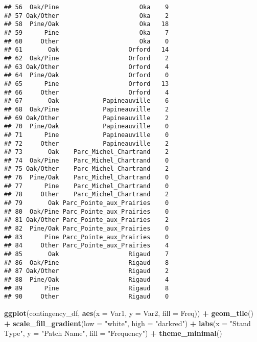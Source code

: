 \documentclass[
]{article}
\newenvironment{Shaded}{\begin{snugshade}}{\end{snugshade}}
\newcommand{\AttributeTok}[1]{\textcolor[rgb]{0.13,0.29,0.53}{#1}}
\newcommand{\FunctionTok}[1]{\textcolor[rgb]{0.13,0.29,0.53}{\textbf{#1}}}
\newcommand{\NormalTok}[1]{#1}
\newcommand{\SpecialCharTok}[1]{\textcolor[rgb]{0.81,0.36,0.00}{\textbf{#1}}}
\newcommand{\StringTok}[1]{\textcolor[rgb]{0.31,0.60,0.02}{#1}}
\begin{document}
\begin{verbatim}
## 56  Oak/Pine                      Oka    9
## 57 Oak/Other                      Oka    2
## 58  Pine/Oak                      Oka   18
## 59      Pine                      Oka    7
## 60     Other                      Oka    0
## 61       Oak                   Orford   14
## 62  Oak/Pine                   Orford    2
## 63 Oak/Other                   Orford    4
## 64  Pine/Oak                   Orford    0
## 65      Pine                   Orford   13
## 66     Other                   Orford    4
## 67       Oak            Papineauville    6
## 68  Oak/Pine            Papineauville    2
## 69 Oak/Other            Papineauville    2
## 70  Pine/Oak            Papineauville    0
## 71      Pine            Papineauville    0
## 72     Other            Papineauville    2
## 73       Oak    Parc_Michel_Chartrand    2
## 74  Oak/Pine    Parc_Michel_Chartrand    0
## 75 Oak/Other    Parc_Michel_Chartrand    2
## 76  Pine/Oak    Parc_Michel_Chartrand    0
## 77      Pine    Parc_Michel_Chartrand    0
## 78     Other    Parc_Michel_Chartrand    2
## 79       Oak Parc_Pointe_aux_Prairies    0
## 80  Oak/Pine Parc_Pointe_aux_Prairies    0
## 81 Oak/Other Parc_Pointe_aux_Prairies    2
## 82  Pine/Oak Parc_Pointe_aux_Prairies    0
## 83      Pine Parc_Pointe_aux_Prairies    0
## 84     Other Parc_Pointe_aux_Prairies    4
## 85       Oak                   Rigaud    7
## 86  Oak/Pine                   Rigaud    8
## 87 Oak/Other                   Rigaud    2
## 88  Pine/Oak                   Rigaud    4
## 89      Pine                   Rigaud    8
## 90     Other                   Rigaud    0
\end{verbatim}

\begin{Shaded}
\begin{Highlighting}[]
\FunctionTok{ggplot}\NormalTok{(contingency\_df, }\FunctionTok{aes}\NormalTok{(}\AttributeTok{x =}\NormalTok{ Var1, }\AttributeTok{y =}\NormalTok{ Var2, }\AttributeTok{fill =}\NormalTok{ Freq)) }\SpecialCharTok{+}
  \FunctionTok{geom\_tile}\NormalTok{() }\SpecialCharTok{+}
  \FunctionTok{scale\_fill\_gradient}\NormalTok{(}\AttributeTok{low =} \StringTok{"white"}\NormalTok{, }\AttributeTok{high =} \StringTok{"darkred"}\NormalTok{) }\SpecialCharTok{+}
  \FunctionTok{labs}\NormalTok{(}\AttributeTok{x =} \StringTok{"Stand Type"}\NormalTok{, }\AttributeTok{y =} \StringTok{"Patch Name"}\NormalTok{, }\AttributeTok{fill =} \StringTok{"Frequency"}\NormalTok{) }\SpecialCharTok{+}
  \FunctionTok{theme\_minimal}\NormalTok{()}
\end{Highlighting}
\end{Shaded}
\end{document}

